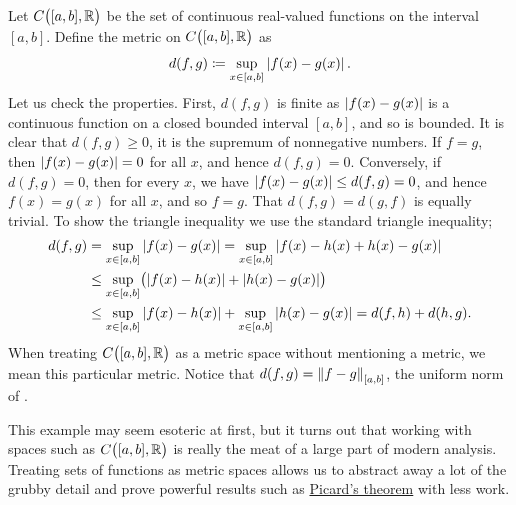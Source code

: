 \begin{example} \label{example:msC01}
Let $C\bigl([a,b],{\mathbb{R}}\bigr)$ be the set of
continuous real-valued functions on the interval $[a,b]$.
Define the metric on $C\bigl([a,b],{\mathbb{R}}\bigr)$ as
\begin{equation*}
d(f,g) \coloneqq \sup_{x \in [a,b]} \left\lvert {f(x)-g(x)} \right\rvert .
\end{equation*}
Let us check the properties.  First, $d(f,g)$ is finite as
$\left\lvert {f(x)-g(x)} \right\rvert$ is a continuous function on a closed bounded interval
$[a,b]$, and so is bounded.
It is clear that $d(f,g) \geq 0$, 
it is the supremum of nonnegative numbers.  If $f = g$,
then $\left\lvert {f(x)-g(x)} \right\rvert = 0$ for all $x$, and hence $d(f,g) = 0$.  Conversely,
if $d(f,g) = 0$, then for every $x$, we have $\left\lvert {f(x)-g(x)} \right\rvert \leq d(f,g) = 0$,
and hence $f(x) = g(x)$ for all $x$, and so $f=g$.  That $d(f,g) = d(g,f)$
is equally trivial.  To show the triangle inequality we use the standard
triangle inequality;
\begin{equation*}
\begin{split}
d(f,g) & =
\sup_{x \in [a,b]} \left\lvert {f(x)-g(x)} \right\rvert =
\sup_{x \in [a,b]} \left\lvert {f(x)-h(x)+h(x)-g(x)} \right\rvert
\\
& \leq
\sup_{x \in [a,b]} \bigl( \left\lvert {f(x)-h(x)} \right\rvert+\left\lvert {h(x)-g(x)} \right\rvert \bigr)
\\
& \leq
\sup_{x \in [a,b]} \left\lvert {f(x)-h(x)} \right\rvert+
\sup_{x \in [a,b]} \left\lvert {h(x)-g(x)} \right\rvert = d(f,h) + d(h,g) .
\end{split}
\end{equation*}
When treating $C\bigl([a,b],{\mathbb{R}}\bigr)$ as a metric space without mentioning a metric,
we mean this particular metric.
Notice that $d(f,g) = \left\lVert {f-g} \right\rVert_{[a,b]}$, the uniform norm of .

This example may seem esoteric at first, but it turns out that working with
spaces such as $C\bigl([a,b],{\mathbb{R}}\bigr)$ is really the meat of a large part of modern 
analysis.  Treating sets of functions as metric spaces allows us to
abstract away a lot of the grubby detail and prove powerful results such as
\hyperref[thm:fs:picard]{Picard's theorem} with less work.
\end{example}


